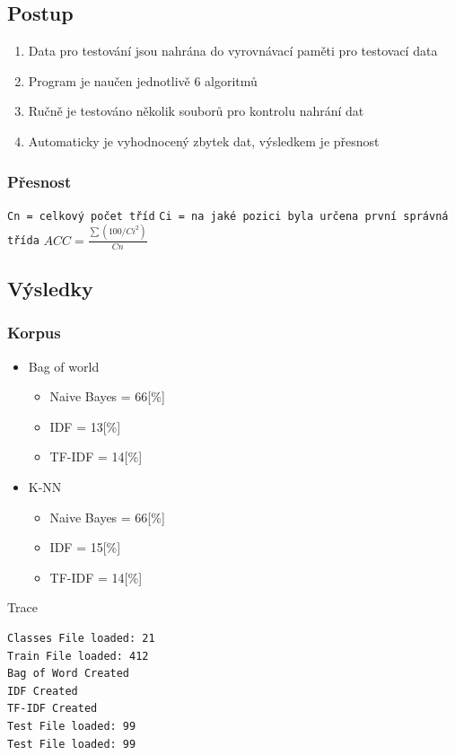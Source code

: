\documentclass[a4paper,12pt]{article}
\begin{document}
\subsection{Postup}
\begin{enumerate}
  \item Data pro testování jsou nahrána do vyrovnávací paměti pro testovací data
  \item Program je naučen jednotlivě 6 algoritmů
  \item Ručně je testováno několik souborů pro kontrolu nahrání dat
  \item Automaticky je vyhodnocený zbytek dat, výsledkem je přesnost  
\end{enumerate}
\subsubsection{Přesnost}
\texttt{Cn = celkový počet tříd}
\linebreak
\texttt{Ci = na jaké pozici byla určena první správná třída}
\linebreak
\linebreak
$ACC=\frac{\sum(100/Ci^{2})}{Cn}$
\subsection{Výsledky}
\subsubsection{Korpus}
\begin{itemize}
    \item Bag of world 
\begin{itemize}
    \item Naive Bayes = 66[\%]
    \item IDF = 13[\%]
    \item TF-IDF = 14[\%]
\end{itemize}
    \item K-NN 
\begin{itemize}
    \item Naive Bayes = 66[\%]
    \item IDF = 15[\%]
    \item TF-IDF = 14[\%]
\end{itemize}
\end{itemize}
Trace
\begin{lstlisting}[language=bash]
Classes File loaded: 21
Train File loaded: 412
Bag of Word Created
IDF Created
TF-IDF Created
Test File loaded: 99
Test File loaded: 99
\end{lstlisting}
\end{document}
